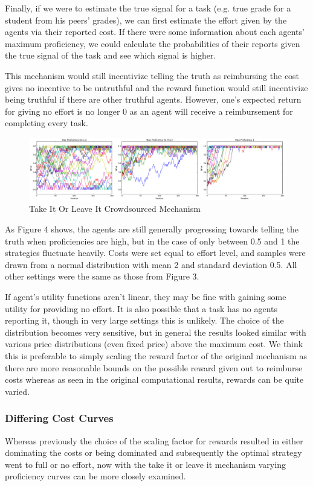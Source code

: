\documentclass{scrartcl}
\begin{document}
Finally, if we were to estimate the true signal for a task (e.g. true grade for a student from his peers' grades), we can first estimate the effort given by the agents via their reported cost. If there were some information about each agents' maximum proficiency, we could calculate the probabilities of their reports given the true signal of the task and see which signal is higher.

This mechanism would still incentivize telling the truth as reimbursing the cost gives no incentive to be untruthful and the reward function would still incentivize being truthful if there are other truthful agents. However, one's expected return for giving no effort is no longer 0 as an agent will receive a reimbursement for completing every task.

 \begin{figure}[H]
	\caption{Take It Or Leave It Crowdsourced Mechanism}
	\centering
	\includegraphics[width=1.0\textwidth]{tioli_effort}
\end{figure}

As Figure 4 shows, the agents are still generally progressing towards telling the truth when proficiencies are high, but in the case of only between 0.5 and 1 the strategies fluctuate heavily. Costs were set equal to effort level, and samples were drawn from a normal distribution with mean 2 and standard deviation 0.5. All other settings were the same as those from Figure 3.

If agent's utility functions aren't linear, they may be fine with gaining some utility for providing no effort. It is also possible that a task has no agents reporting it, though in very large settings this is unlikely. The choice of the distribution becomes very sensitive, but in general the results looked similar with various price distributions (even fixed price) above the maximum cost. We think this is preferable to simply scaling the reward factor of the original mechanism as there are more reasonable bounds on the possible reward given out to reimburse costs whereas as seen in the original computational results, rewards can be quite varied.

\subsubsection{Differing Cost Curves}
Whereas previously the choice of the scaling factor for rewards resulted in either dominating the costs or being dominated and subsequently the optimal strategy went to full or no effort, now with the take it or leave it mechanism varying proficiency curves can be more closely examined.
\end{document}
